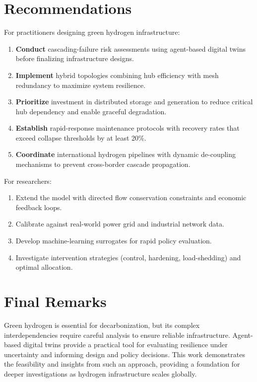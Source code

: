 \documentclass[12pt,a4paper,twoside]{report}
\begin{document}
\section{Recommendations}

For practitioners designing green hydrogen infrastructure:
\begin{enumerate}
\item \textbf{Conduct} cascading-failure risk assessments using agent-based digital twins before finalizing infrastructure designs.
\item \textbf{Implement} hybrid topologies combining hub efficiency with mesh redundancy to maximize system resilience.
\item \textbf{Prioritize} investment in distributed storage and generation to reduce critical hub dependency and enable graceful degradation.
\item \textbf{Establish} rapid-response maintenance protocols with recovery rates that exceed collapse thresholds by at least 20\%.
\item \textbf{Coordinate} international hydrogen pipelines with dynamic de-coupling mechanisms to prevent cross-border cascade propagation.
\end{enumerate}

For researchers:
\begin{enumerate}
\item Extend the model with directed flow conservation constraints and economic feedback loops.
\item Calibrate against real-world power grid and industrial network data.
\item Develop machine-learning surrogates for rapid policy evaluation.
\item Investigate intervention strategies (control, hardening, load-shedding) and optimal allocation.
\end{enumerate}

\section{Final Remarks}

Green hydrogen is essential for decarbonization, but its complex interdependencies require careful analysis to ensure reliable infrastructure. Agent-based digital twins provide a practical tool for evaluating resilience under uncertainty and informing design and policy decisions. This work demonstrates the feasibility and insights from such an approach, providing a foundation for deeper investigations as hydrogen infrastructure scales globally.
\end{document}
